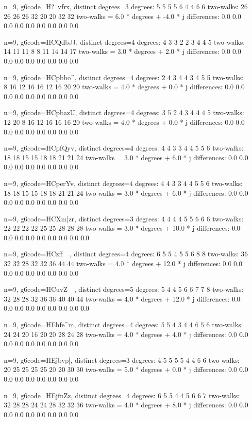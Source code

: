 {{{{{{{{n=9, g6code=H?~vfrx, distinct degrees=3
degrees: 5 5 5 5 6 4 4 6 6 
two-walks: 26 26 26 26 32 20 20 32 32 
two-walks = 6.0 * degrees + -4.0 * j
differences: 0.0 0.0 0.0 0.0 0.0 0.0 0.0 0.0 0.0 

n=9, g6code=HCQdbJJ, distinct degrees=4
degrees: 4 3 3 2 2 3 4 4 5 
two-walks: 14 11 11 8 8 11 14 14 17 
two-walks = 3.0 * degrees + 2.0 * j
differences: 0.0 0.0 0.0 0.0 0.0 0.0 0.0 0.0 0.0 

n=9, g6code=HCpbbo^, distinct degrees=4
degrees: 2 4 3 4 4 3 4 5 5 
two-walks: 8 16 12 16 16 12 16 20 20 
two-walks = 4.0 * degrees + 0.0 * j
differences: 0.0 0.0 0.0 0.0 0.0 0.0 0.0 0.0 0.0 

n=9, g6code=HCpbazU, distinct degrees=4
degrees: 3 5 2 4 3 4 4 4 5 
two-walks: 12 20 8 16 12 16 16 16 20 
two-walks = 4.0 * degrees + 0.0 * j
differences: 0.0 0.0 0.0 0.0 0.0 0.0 0.0 0.0 0.0 

n=9, g6code=HCpfQyv, distinct degrees=4
degrees: 4 4 3 3 4 4 5 5 6 
two-walks: 18 18 15 15 18 18 21 21 24 
two-walks = 3.0 * degrees + 6.0 * j
differences: 0.0 0.0 0.0 0.0 0.0 0.0 0.0 0.0 0.0 

n=9, g6code=HCperYv, distinct degrees=4
degrees: 4 4 3 3 4 4 5 5 6 
two-walks: 18 18 15 15 18 18 21 21 24 
two-walks = 3.0 * degrees + 6.0 * j
differences: 0.0 0.0 0.0 0.0 0.0 0.0 0.0 0.0 0.0 

n=9, g6code=HCXm|zr, distinct degrees=3
degrees: 4 4 4 4 5 5 6 6 6 
two-walks: 22 22 22 22 25 25 28 28 28 
two-walks = 3.0 * degrees + 10.0 * j
differences: 0.0 0.0 0.0 0.0 0.0 0.0 0.0 0.0 0.0 

n=9, g6code=HCzff~~, distinct degrees=4
degrees: 6 5 5 4 5 5 6 8 8 
two-walks: 36 32 32 28 32 32 36 44 44 
two-walks = 4.0 * degrees + 12.0 * j
differences: 0.0 0.0 0.0 0.0 0.0 0.0 0.0 0.0 0.0 

n=9, g6code=HCuvZ~~, distinct degrees=5
degrees: 5 4 4 5 6 6 7 7 8 
two-walks: 32 28 28 32 36 36 40 40 44 
two-walks = 4.0 * degrees + 12.0 * j
differences: 0.0 0.0 0.0 0.0 0.0 0.0 0.0 0.0 0.0 

n=9, g6code=HEhfe^m, distinct degrees=4
degrees: 5 5 4 3 4 4 6 5 6 
two-walks: 24 24 20 16 20 20 28 24 28 
two-walks = 4.0 * degrees + 4.0 * j
differences: 0.0 0.0 0.0 0.0 0.0 0.0 0.0 0.0 0.0 

n=9, g6code=HEjbvp|, distinct degrees=3
degrees: 4 5 5 5 5 4 4 6 6 
two-walks: 20 25 25 25 25 20 20 30 30 
two-walks = 5.0 * degrees + 0.0 * j
differences: 0.0 0.0 0.0 0.0 0.0 0.0 0.0 0.0 0.0 

n=9, g6code=HEjfnZz, distinct degrees=4
degrees: 6 5 5 4 4 5 6 6 7 
two-walks: 32 28 28 24 24 28 32 32 36 
two-walks = 4.0 * degrees + 8.0 * j
differences: 0.0 0.0 0.0 0.0 0.0 0.0 0.0 0.0 0.0 

}}}}}}}}

